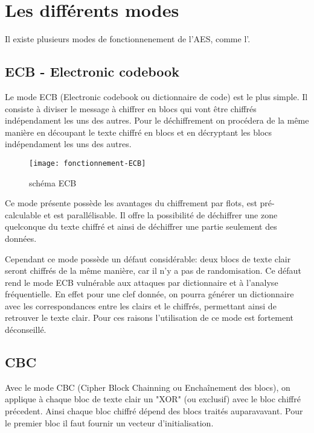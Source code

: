 \chapter{Les différents modes}
\label{chap:différents modes}

Il existe plusieurs modes de fonctionnenement de l'AES, comme l'\aes.

\section{ECB - Electronic codebook}

Le mode ECB (Electronic codebook ou dictionnaire de code) est le plus simple. Il consiste à diviser le message à chiffrer en blocs qui vont être chiffrés indépendament les uns des autres. Pour le déchiffrement on procédera de la même manière en découpant le texte chiffré en blocs et en décryptant les blocs indépendament les uns des autres.

\begin{figure}[!h]
  \centering
  \texttt{[image: fonctionnement-ECB]}
  \caption{schéma ECB \cite{wiki}}
  \label{schema ECB}
\end{figure}

Ce mode présente possède les avantages du chiffrement par flots, est pré-calculable et est parallélisable. Il offre la possibilité de déchiffrer une zone quelconque du texte chiffré et ainsi de déchiffrer une partie seulement des données.

Cependant ce mode possède un défaut considérable: deux blocs de texte clair seront chiffrés de la même manière, car il n'y a pas de randomisation. Ce défaut rend le mode ECB vulnérable aux attaques par dictionnaire et à l'analyse fréquentielle. En effet pour une clef donnée, on pourra générer un dictionnaire avec les correspondances entre les clairs et le chiffrés, permettant ainsi de retrouver le texte clair. Pour ces raisons l'utilisation de ce mode est fortement déconseillé.

\section{CBC}

Avec le mode CBC (Cipher Block Chainning ou Enchaînement des blocs), on applique à chaque bloc de texte clair un "XOR" (ou exclusif) avec le bloc chiffré précedent. Ainsi chaque bloc chiffré dépend des blocs traités auparavavant. Pour le premier bloc il faut fournir un vecteur d'initialisation.

